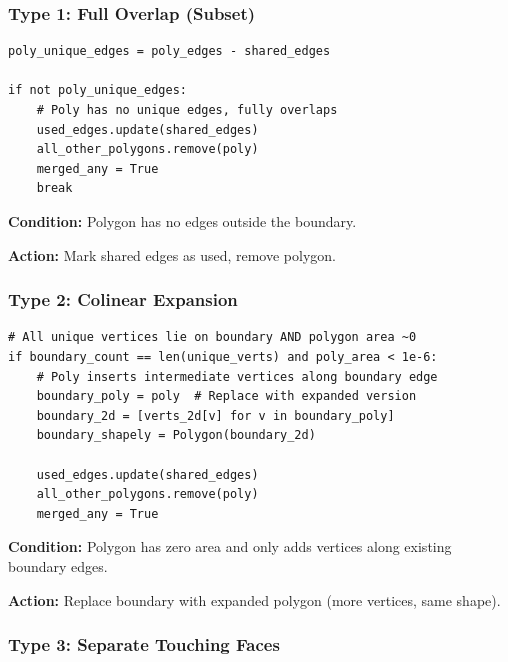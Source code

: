 \documentclass[11pt]{article}
\begin{document}
\subsubsection{Type 1: Full Overlap (Subset)}

\begin{lstlisting}[caption={Handling complete overlap},label={lst:fullover}]
poly_unique_edges = poly_edges - shared_edges

if not poly_unique_edges:
    # Poly has no unique edges, fully overlaps
    used_edges.update(shared_edges)
    all_other_polygons.remove(poly)
    merged_any = True
    break
\end{lstlisting}

\textbf{Condition:} Polygon has no edges outside the boundary.

\textbf{Action:} Mark shared edges as used, remove polygon.

\subsubsection{Type 2: Colinear Expansion}

\begin{lstlisting}[caption={Colinear vertex insertion},label={lst:colinear}]
# All unique vertices lie on boundary AND polygon area ~0
if boundary_count == len(unique_verts) and poly_area < 1e-6:
    # Poly inserts intermediate vertices along boundary edge
    boundary_poly = poly  # Replace with expanded version
    boundary_2d = [verts_2d[v] for v in boundary_poly]
    boundary_shapely = Polygon(boundary_2d)
    
    used_edges.update(shared_edges)
    all_other_polygons.remove(poly)
    merged_any = True
\end{lstlisting}

\textbf{Condition:} Polygon has zero area and only adds vertices along existing boundary edges.

\textbf{Action:} Replace boundary with expanded polygon (more vertices, same shape).

\subsubsection{Type 3: Separate Touching Faces}
\end{document}
